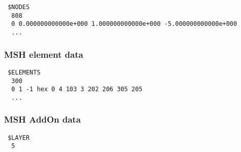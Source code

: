 \small
\begin{verbatim}
 $NODES
  808
  0 0.000000000000e+000 1.000000000000e+000 -5.000000000000e+000
  ...
\end{verbatim}
\normalsize

\subsubsection{MSH element data}

\small
\begin{verbatim}
 $ELEMENTS
  300
  0 1 -1 hex 0 4 103 3 202 206 305 205
  ...
\end{verbatim}
\normalsize

\subsubsection{MSH AddOn data}

\small
\begin{verbatim}
 $LAYER
  5
\end{verbatim}
\normalsize

\vfill {}
